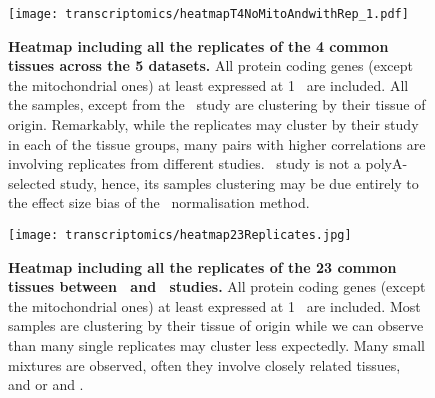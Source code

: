 \begin{figure}[htpb]
    \texttt{[image: transcriptomics/heatmapT4NoMitoAndwithRep\_1.pdf]}\centering
    \caption[Heatmap including all the replicates of the 4 common tissues
    across the 5 datasets]{\label{fig:noMitoRep4T}\textbf{Heatmap including all
    the replicates of the 4 common tissues across the 5 datasets.} All protein
    coding genes (except the mitochondrial ones)
    at least expressed at 1 \FPKM\ are included. All the samples, except from the
    \castle\ study are clustering by their tissue of origin.
    Remarkably, while the replicates may cluster by their study in each of the
    tissue groups, many pairs with higher correlations are involving replicates
    from different studies. \castle\ study is not a polyA-selected study, hence,
    its samples clustering may be due entirely to the effect size bias of the
    \FPKM\ normalisation method.}
\end{figure}

\begin{figure}[htpb]
    \texttt{[image: transcriptomics/heatmap23Replicates.jpg]}\centering
    \caption[Heatmap including all the replicates of the 23 common tissues
    between Uhlén and GTEx studies]{\label{fig:noMitoRep23T}\textbf{Heatmap
    including all the replicates of the 23 common tissues between \uhlen\ and
    \gtex\ studies.} All protein coding genes (except the mitochondrial ones)
    at least expressed at 1 \FPKM\ are included. Most samples are clustering by
    their tissue of origin while we can observe than many single replicates may
    cluster less expectedly. Many small mixtures are observed, often they involve
    closely related tissues, \ie\  and  or
     and .}
\end{figure}


